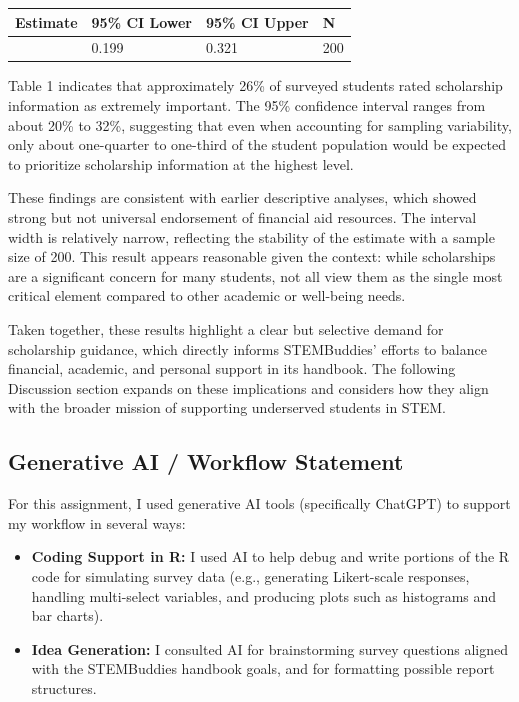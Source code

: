 \documentclass[
  letterpaper,
  DIV=11,
  numbers=noendperiod]{scrartcl}
\providecommand{\tightlist}{%
  \setlength{\itemsep}{0pt}\setlength{\parskip}{0pt}}\usepackage{longtable,booktabs,array}
\begin{document}
\begin{longtable}[]{@{}llll@{}}
\toprule\noalign{}
Estimate & 95\% CI Lower & 95\% CI Upper & N \\
\midrule\noalign{}
\endhead
\bottomrule\noalign{}
\endlastfoot
0.26 & 0.199 & 0.321 & 200 \\
\end{longtable}

Table 1 indicates that approximately 26\% of surveyed students rated
scholarship information as extremely important. The 95\% confidence
interval ranges from about 20\% to 32\%, suggesting that even when
accounting for sampling variability, only about one-quarter to one-third
of the student population would be expected to prioritize scholarship
information at the highest level.

These findings are consistent with earlier descriptive analyses, which
showed strong but not universal endorsement of financial aid resources.
The interval width is relatively narrow, reflecting the stability of the
estimate with a sample size of 200. This result appears reasonable given
the context: while scholarships are a significant concern for many
students, not all view them as the single most critical element compared
to other academic or well-being needs.

Taken together, these results highlight a clear but selective demand for
scholarship guidance, which directly informs STEMBuddies' efforts to
balance financial, academic, and personal support in its handbook. The
following Discussion section expands on these implications and considers
how they align with the broader mission of supporting underserved
students in STEM.

\subsection{Generative AI / Workflow
Statement}\label{generative-ai-workflow-statement}

For this assignment, I used generative AI tools (specifically ChatGPT)
to support my workflow in several ways:

\begin{itemize}
\tightlist
\item
  \textbf{Coding Support in R:} I used AI to help debug and write
  portions of the R code for simulating survey data (e.g., generating
  Likert-scale responses, handling multi-select variables, and producing
  plots such as histograms and bar charts).\\
\item
  \textbf{Idea Generation:} I consulted AI for brainstorming survey
  questions aligned with the STEMBuddies handbook goals, and for
  formatting possible report structures.
\end{itemize}
\end{document}
